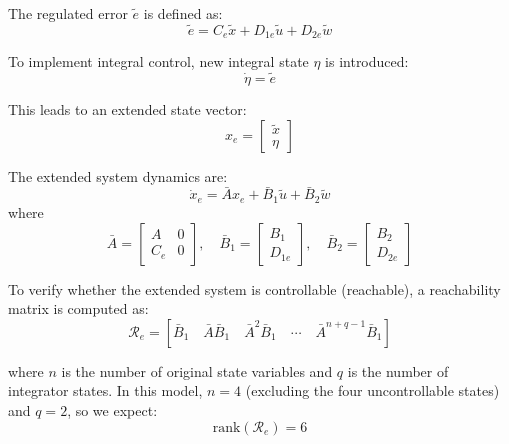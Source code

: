 \documentclass[]{report}
\begin{document}
	The regulated error $\tilde{e}$ is defined as:
	\begin{equation}
		\tilde{e} = C_e \tilde{x} + D_{1e} \tilde{u} + D_{2e} \tilde{w}
	\end{equation}
	
	To implement integral control, new integral state $\eta$ is introduced:
	\begin{equation}
		\dot{\eta} = \tilde{e}
	\end{equation}
	
	This leads to an extended state vector:
	\begin{equation}
		x_e = \begin{bmatrix} \tilde{x} \\ \eta \end{bmatrix}
	\end{equation}
	
	The extended system dynamics are:
	\begin{equation}
		\dot{x}_e = \bar{A} x_e + \bar{B}_1 \tilde{u} + \bar{B}_2 \tilde{w}
	\end{equation}
	where
	\begin{equation}
		\bar{A} = \begin{bmatrix}
			A & 0 \\
			C_e & 0
		\end{bmatrix},
		\quad
		\bar{B}_1 = \begin{bmatrix}
			B_1 \\
			D_{1e}
		\end{bmatrix},
		\quad
		\bar{B}_2 = \begin{bmatrix}
			B_2 \\
			D_{2e}
		\end{bmatrix}
	\end{equation}
	
	To verify whether the extended system is controllable (reachable), a reachability matrix is computed as:
	\begin{equation}
		\mathcal{R}_e = \left[\bar{B}_1 \quad \bar{A}\bar{B}_1 \quad \bar{A}^2\bar{B}_1 \quad \cdots \quad \bar{A}^{n+q-1} \bar{B}_1 \right]
	\end{equation}
	
	where $n$ is the number of original state variables and $q$ is the number of integrator states. In this model, $n=4$ (excluding the four uncontrollable states) and $q=2$, so we expect:
	\begin{equation}
		\text{rank}(\mathcal{R}_e) = 6
	\end{equation}
	
\end{document}
